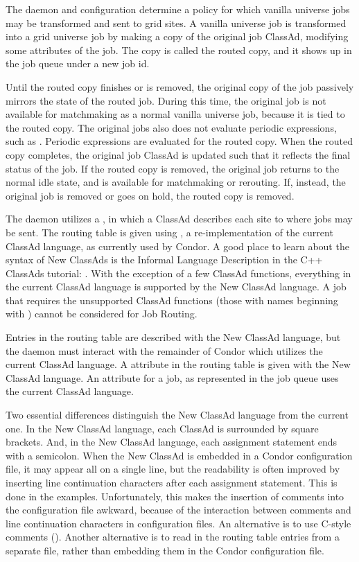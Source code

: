 The  daemon and configuration determine a policy
for which vanilla universe jobs may be transformed and sent to 
grid sites.
A vanilla universe job is transformed into a grid universe job
by making a copy of the original job ClassAd, 
modifying some attributes of the job.
The copy is called the routed copy,
and it shows up in the job queue under a new job id.

Until the routed copy finishes or is removed,
the original copy of the job passively mirrors the state of the routed job.
During this time,
the original job is not available for matchmaking 
as a normal vanilla universe job,
because it is tied to the routed copy.
The original jobs also does not evaluate periodic expressions,
such as .
Periodic expressions are evaluated for the routed copy.
When the routed copy completes,
the original job ClassAd is updated such that it reflects the
final status of the job.
If the routed copy is removed,
the original job returns to the normal idle state,
and is available for matchmaking or rerouting.
If, instead, the original job is removed or goes on hold,
the routed copy is removed.

The  daemon utilizes a ,
in which a ClassAd describes each site to where jobs may be sent.
The routing table is given using ,
a re-implementation of the current ClassAd language,
as currently used by Condor.
A good place to learn about the syntax of New ClassAds
is the Informal Language Description in the C++ ClassAds
tutorial: .
With the exception of a few ClassAd functions,
everything in the current ClassAd language is
supported by the New ClassAd language.
A job that requires the unsupported ClassAd functions
(those with names beginning with )
cannot be considered for Job Routing.

Entries in the routing table are described with the New ClassAd language,
but the  daemon must interact with the
remainder of Condor which utilizes the current ClassAd language.
A  attribute in the routing table is given
with the New ClassAd language.
An attribute for a job, as represented in the job queue
uses the current ClassAd language.

Two essential differences distinguish the New ClassAd language
from the current one.
In the New ClassAd language,
each ClassAd is surrounded by square brackets.
And, in the New ClassAd language,
each assignment statement ends with a semicolon.
When the New
ClassAd is embedded in a Condor configuration file,
it may appear all on a single line,
but the readability is often improved by inserting line continuation
characters
after each assignment statement.
This is done in the examples.
Unfortunately, this makes the insertion of comments into
the configuration file awkward,
because of the interaction between comments and line continuation
characters in configuration files.
An alternative is to use C-style comments (\Code{/* \Dots */}).
Another alternative is to read in the routing table entries
from a separate file,
rather than embedding them in the Condor configuration file.

